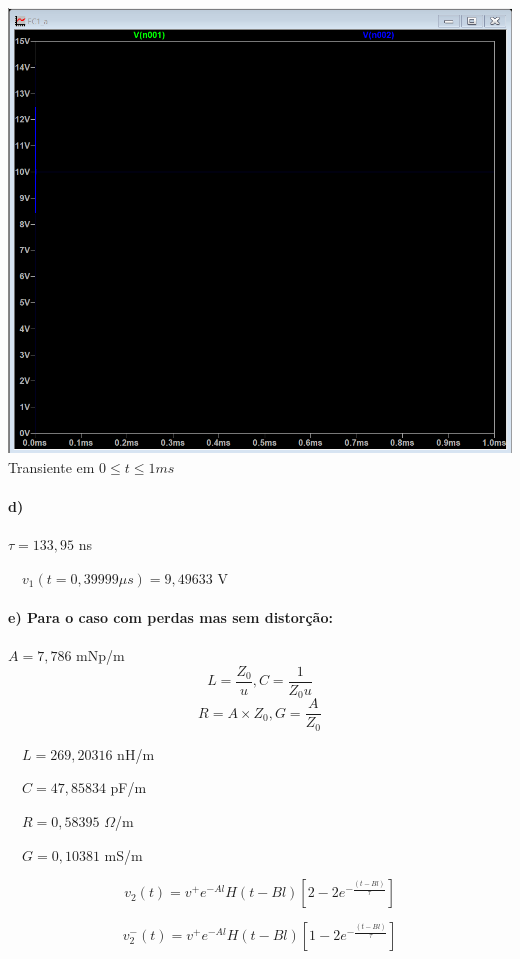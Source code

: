 \documentclass[12pt,a4paper]{article}
\begin{document}
\begin{center}
    \includegraphics[scale=0.5]{Q1 item c 2.png}\\
    
    \small{Transiente em $0 \le t \le 1ms$}\\
\end{center}

\paragraph{d)}

$\tau = 133,95$ ns

\ \ $v_1(t=0,39999\mu s) = 9,49633$ V

\paragraph{e) Para o caso com perdas mas sem distorção:}
$A = 7,786$ mNp/m
$$L = \frac{Z_0}{u}, C = \frac{1}{Z_0u}$$
$$R = A\times Z_0, G = \frac{A}{Z_0}$$

\ \ $L = 269,20316$ nH/m

\ \ $C = 47,85834$ pF/m

\ \ $R = 0,58395$ $\Omega$/m

\ \ $G = 0,10381$ mS/m

$$v_2(t) = v^+ e^{-Al} H(t-Bl)\left[ 2 - 2e^{-\frac{(t-Bl)}{\tau}} \right]$$

$$v_2^-(t) = v^+ e^{-Al} H(t-Bl)\left[ 1 - 2e^{-\frac{(t-Bl)}{\tau}} \right]$$
\end{document}
